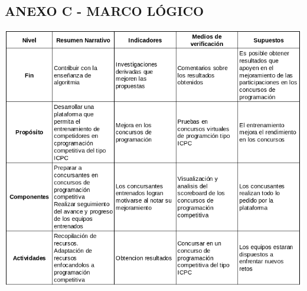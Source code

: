 \newpage
\subsection*{ANEXO C - MARCO LÓGICO}
\begin{center}
    \includegraphics[scale=1.2]{imagenes/marco logico.png}
\end{center}
